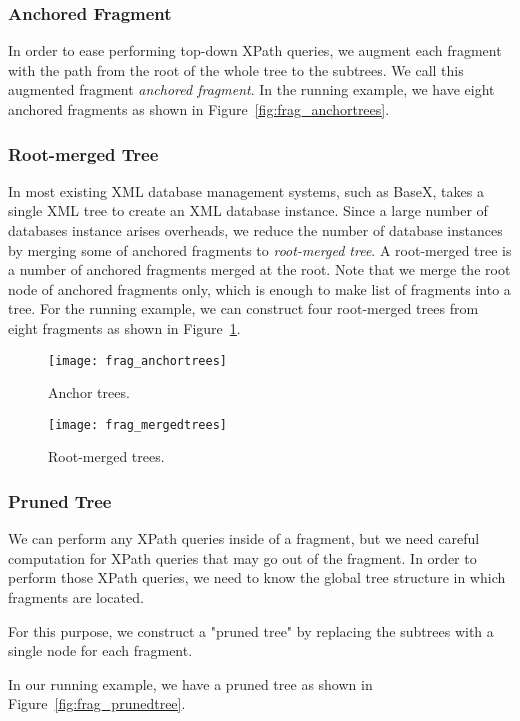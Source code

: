 \subsubsection{Anchored Fragment}

In order to ease performing top-down XPath queries, we augment
each fragment with the path from the root of the whole tree to the
subtrees.  We call this augmented fragment  \emph{anchored
fragment}. In the running example, we have eight anchored fragments as shown in Figure~\ref{fig:frag_anchortrees}.
 

\subsubsection{Root-merged Tree}

In most existing XML database management systems, such as BaseX, takes a 
single XML tree to create an XML database instance. Since a large number of 
databases instance arises overheads, we reduce the number of database 
instances by merging some of anchored fragments to \emph{root-merged tree}.
A root-merged tree is a number of anchored fragments merged at the root.
Note that we merge the root node of anchored fragments only, which is
enough to make list of fragments into a tree. 
For the running example, we can construct four root-merged trees from eight
fragments as shown in Figure~\ref{fig:frag_mergedtrees}.


\begin{figure}[t]   
	\texttt{[image: frag\_anchortrees]}
	\caption{Anchor trees.}
	\label{fig:frag_anchortrees}	
	
	\texttt{[image: frag\_mergedtrees]}
	\caption{Root-merged trees.}
	\label{fig:frag_mergedtrees}
\end{figure}

\subsubsection{Pruned Tree}
 
We can perform any XPath queries inside of a fragment, but we need
careful computation for XPath queries that may go out of the fragment.
In order to perform those XPath queries, we need to know the global
tree structure in which fragments are located.

For this purpose, we construct a "pruned tree" by replacing the subtrees
with a single node for each fragment.

In our running example, we have a pruned tree as shown in Figure~\ref{fig:frag_prunedtree}. 

